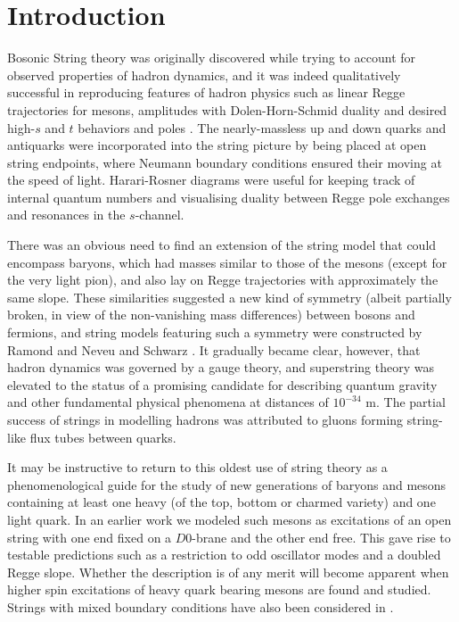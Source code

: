 \documentclass[a4paper,a4paper]{article}
\begin{document}
\begin{titlepage}
\begin{abstract}
\end{abstract}%


\end{titlepage}


\section{Introduction}


Bosonic String theory was originally discovered  \cite{Nambu,
Susskind} while trying to account for observed properties of
hadron dynamics, and it was indeed qualitatively successful in
reproducing features of hadron physics such as linear Regge
trajectories for mesons, amplitudes with Dolen-Horn-Schmid duality
\cite{Dolen} and desired high-$s$ and $t$ behaviors and poles
\cite{Ven}. The nearly-massless up and down quarks and antiquarks
were incorporated into the string picture by being placed at open
string endpoints, where Neumann boundary conditions ensured their
moving at the speed of light.  Harari-Rosner diagrams
\cite{Har,Ros} were useful for keeping track of internal quantum
numbers and visualising duality between Regge pole exchanges and
resonances in the $s$-channel.

There was an obvious need to find an extension of the string model
that could encompass baryons, which had masses similar to those of
the mesons (except for the very light pion), and also lay
on Regge trajectories with approximately the same slope.  These
similarities suggested a new kind of symmetry (albeit partially
broken, in view of the non-vanishing mass differences) between
bosons and fermions, and string models featuring such a symmetry
were constructed by Ramond \cite{Ramond} and Neveu and Schwarz
\cite{NS}.  It gradually became clear, however, that
hadron dynamics was governed by a gauge theory, and
superstring theory was elevated to the status of a promising candidate
for describing quantum gravity and other fundamental physical phenomena at
distances of $10^{-34}$ m.  The partial success of strings in modelling
hadrons was attributed to gluons forming string-like flux tubes between
quarks.

It may be instructive to return to this oldest use
of string theory as a phenomenological guide for the study of new
generations of baryons and mesons containing at least one heavy
(of the top, bottom or charmed variety) and one light quark. In an
earlier work \cite{Gursoy} we modeled such mesons as excitations of an
open string with one end fixed on a $D0$-brane and the other end free.
This gave rise to testable predictions such as a restriction to
odd oscillator modes and a doubled Regge slope.  Whether the
description is of any merit will become apparent when higher
spin excitations
of heavy quark bearing mesons are found and studied.  Strings with mixed
boundary conditions have also been considered in
\cite{Fair,Sieg,Klein,Froh}.
\end{document}
